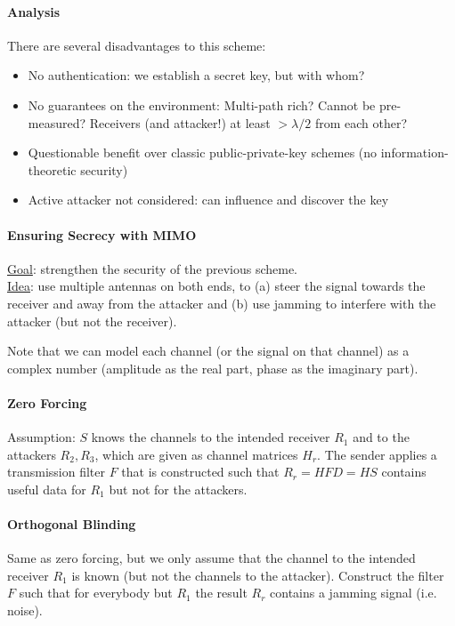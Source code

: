 \paragraph{Analysis}
There are several disadvantages to this scheme:
\begin{itemize}
	\item No authentication: we establish a secret key, but with whom?
	\item No guarantees on the environment:
	Multi-path rich? Cannot be pre-measured? Receivers (and attacker!) at least $> \lambda / 2$ from each other?
	\item Questionable benefit over classic public-private-key schemes (no information-theoretic security)
	\item Active attacker not considered: can influence and discover the key
\end{itemize}

\paragraph{Ensuring Secrecy with MIMO}
\underline{Goal}: strengthen the security of the previous scheme.
\\
\underline{Idea}: use multiple antennas on both ends, to
(a) steer the signal towards the receiver and away from the attacker and
(b) use jamming to interfere with the attacker (but not the receiver).

Note that we can model each channel (or the signal on that channel) as a complex number (amplitude as the real part, phase as the imaginary part).

\paragraph{Zero Forcing}
Assumption: $S$ knows the channels to the intended receiver $R_1$ and to the attackers $R_2, R_3$, which are given as channel matrices $H_r$.
The sender applies a transmission filter $F$ that is constructed such that $R_r = H F D = H S$ contains useful data for $R_1$ but not for the attackers.

\paragraph{Orthogonal Blinding}
Same as zero forcing, but we only assume that the channel to the intended receiver $R_1$ is known (but not the channels to the attacker).
Construct the filter $F$ such that for everybody but $R_1$ the result $R_r$ contains a jamming signal (i.e. noise).

